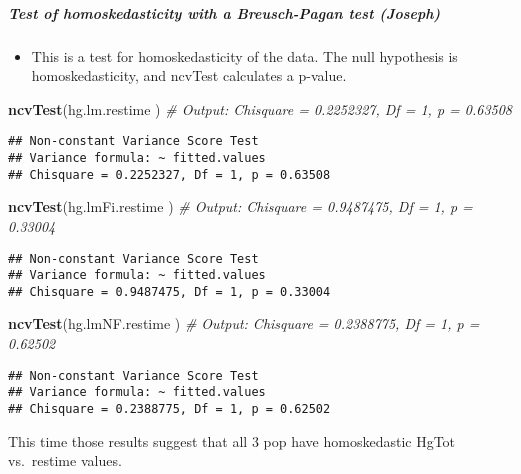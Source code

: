 \documentclass[12pt,]{article}
\newenvironment{Shaded}{\begin{snugshade}}{\end{snugshade}}
\newcommand{\KeywordTok}[1]{\textcolor[rgb]{0.13,0.29,0.53}{\textbf{#1}}}
\newcommand{\CommentTok}[1]{\textcolor[rgb]{0.56,0.35,0.01}{\textit{#1}}}
\newcommand{\NormalTok}[1]{#1}
\providecommand{\tightlist}{%
  \setlength{\itemsep}{0pt}\setlength{\parskip}{0pt}}
\let\oldsubparagraph\subparagraph
\renewcommand{\subparagraph}[1]{\oldsubparagraph{#1}\mbox{}}
\begin{document}
\subparagraph{Test of homoskedasticity with a Breusch-Pagan test
(Joseph)}\label{test-of-homoskedasticity-with-a-breusch-pagan-test-joseph-1}

\begin{itemize}
\tightlist
\item
  This is a test for homoskedasticity of the data. The null hypothesis
  is homoskedasticity, and ncvTest calculates a p-value.
\end{itemize}

\begin{Shaded}
\begin{Highlighting}[]
\KeywordTok{ncvTest}\NormalTok{(hg.lm.restime ) }\CommentTok{# Output: Chisquare = 0.2252327, Df = 1, p = 0.63508}
\end{Highlighting}
\end{Shaded}

\begin{verbatim}
## Non-constant Variance Score Test 
## Variance formula: ~ fitted.values 
## Chisquare = 0.2252327, Df = 1, p = 0.63508
\end{verbatim}

\begin{Shaded}
\begin{Highlighting}[]
\KeywordTok{ncvTest}\NormalTok{(hg.lmFi.restime ) }\CommentTok{# Output: Chisquare = 0.9487475, Df = 1, p = 0.33004}
\end{Highlighting}
\end{Shaded}

\begin{verbatim}
## Non-constant Variance Score Test 
## Variance formula: ~ fitted.values 
## Chisquare = 0.9487475, Df = 1, p = 0.33004
\end{verbatim}

\begin{Shaded}
\begin{Highlighting}[]
\KeywordTok{ncvTest}\NormalTok{(hg.lmNF.restime ) }\CommentTok{# Output: Chisquare = 0.2388775, Df = 1, p = 0.62502}
\end{Highlighting}
\end{Shaded}

\begin{verbatim}
## Non-constant Variance Score Test 
## Variance formula: ~ fitted.values 
## Chisquare = 0.2388775, Df = 1, p = 0.62502
\end{verbatim}

This time those results suggest that all 3 pop have homoskedastic HgTot
vs.~restime values.
\end{document}
